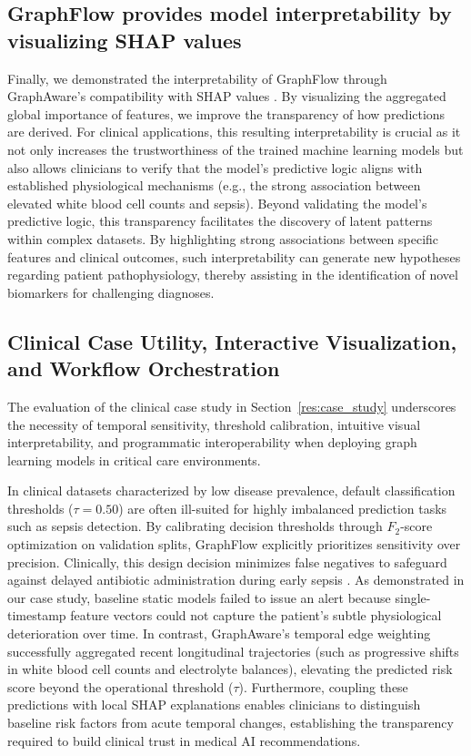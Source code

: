 \documentclass[pdflatex,sn-mathphys-num,lineno]{sn-jnl}
\theoremstyle{thmstyleone}%
\theoremstyle{thmstyletwo}%
\theoremstyle{thmstylethree}%
\begin{document}
\subsection{GraphFlow provides model interpretability by visualizing SHAP values}\label{disc:interpret}
Finally, we demonstrated the interpretability of GraphFlow through GraphAware's compatibility with SHAP values \cite{NIPS2017_7062,walke2026graphaware}. By visualizing the aggregated global importance of features, we improve the transparency of how predictions are derived. For clinical applications, this resulting interpretability is crucial as it not only increases the trustworthiness of the trained machine learning models but also allows clinicians to verify that the model's predictive logic aligns with established physiological mechanisms (e.g., the strong association between elevated white blood cell counts and sepsis). Beyond validating the model's predictive logic, this transparency facilitates the discovery of latent patterns within complex datasets. By highlighting strong associations between specific features and clinical outcomes, such interpretability can generate new hypotheses regarding patient pathophysiology, thereby assisting in the identification of novel biomarkers for challenging diagnoses.

\subsection{Clinical Case Utility, Interactive Visualization, and Workflow Orchestration}\label{disc:case_mcp}

The evaluation of the clinical case study in Section~\ref{res:case_study} underscores the necessity of temporal sensitivity, threshold calibration, intuitive visual interpretability, and programmatic interoperability when deploying graph learning models in critical care environments.

In clinical datasets characterized by low disease prevalence, default classification thresholds ($\tau = 0.50$) are often ill-suited for highly imbalanced prediction tasks such as sepsis detection. By calibrating decision thresholds through $F_2$-score optimization on validation splits, GraphFlow explicitly prioritizes sensitivity over precision. Clinically, this design decision minimizes false negatives to safeguard against delayed antibiotic administration during early sepsis \cite{Evans2021}. As demonstrated in our case study, baseline static models failed to issue an alert because single-timestamp feature vectors could not capture the patient's subtle physiological deterioration over time. In contrast, GraphAware's temporal edge weighting successfully aggregated recent longitudinal trajectories (such as progressive shifts in white blood cell counts and electrolyte balances), elevating the predicted risk score beyond the operational threshold ($\tau$). Furthermore, coupling these predictions with local SHAP explanations enables clinicians to distinguish baseline risk factors from acute temporal changes, establishing the transparency required to build clinical trust in medical AI recommendations.
\end{document}
